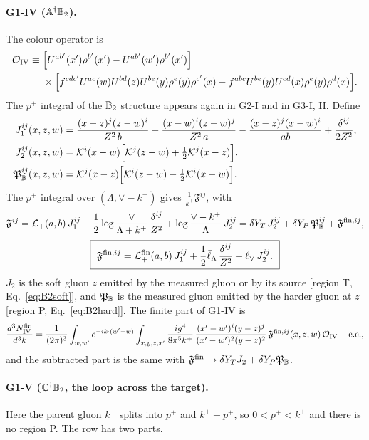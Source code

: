 \paragraph*{G1-IV ($\bar{\mathbb{A}}^\dagger\mathbb{B}_2$).} The colour operator is
\begin{align}
\mathcal{O}_{\rm IV}\equiv{}&\Big[U^{ab'}(x')\rho^{b'}(x')-U^{ab'}(w')\rho^{b'}(x')\Big]\notag\\
&\times\Big[f^{cdc'}U^{ac}(w)U^{bd}(z)U^{be}(y)\rho^e(y)\rho^{c'}(x)-f^{abc}U^{be}(y)U^{cd}(x)\rho^e(y)\rho^d(x)\Big].
\end{align}
The $p^+$ integral of the $\mathbb{B}_2$ structure appears again in G2-I and in G3-I, II. Define
\begin{align}
J_1^{ij}(x,z,w)&=\frac{(x-z)^j(z-w)^i}{Z^2\,b}-\frac{(x-w)^i(z-w)^j}{Z^2\,a}-\frac{(x-z)^j(x-w)^i}{ab}+\frac{\delta^{ij}}{2Z^2},\notag\\
J_2^{ij}(x,z,w)&=\mathcal{K}^i(x-w)\Big[\mathcal{K}^j(z-w)+\tfrac12\mathcal{K}^j(x-z)\Big],\notag\\
\mathfrak P_{\mathbb{B}}^{ij}(x,z,w)&=\mathcal{K}^j(x-z)\Big[\mathcal{K}^i(z-w)-\tfrac12\mathcal{K}^i(x-w)\Big].
\label{eq:J12}
\end{align}
The $p^+$ integral over $(\Lambda,\vee-k^+)$ gives $\frac{1}{k^+}\mathfrak F^{ij}$, with
\begin{equation}
\mathfrak F^{ij}=\mathcal{L}_{+}(a,b)\,J_1^{ij}-\frac12\log\frac{\vee}{\Lambda+k^+}\,\frac{\delta^{ij}}{Z^2}+\log\frac{\vee-k^+}{\Lambda}\,J_2^{ij}=\delta Y_T\,J_2^{ij}+\delta Y_P\,\mathfrak P_{\mathbb{B}}^{ij}+\mathfrak F^{{\rm fin},ij},
\label{eq:Fcal}
\end{equation}
\begin{equation}
\boxed{\ \mathfrak F^{{\rm fin},ij}=\Lp^{\rm fin}(a,b)\,J_1^{ij}+\frac12\lLb\,\frac{\delta^{ij}}{Z^2}+\lV\,J_2^{ij}.\ }
\label{eq:Ffin}
\end{equation}
$J_2$ is the soft gluon $z$ emitted by the measured gluon or by its source [region T, Eq.~\eqref{eq:B2soft}], and $\mathfrak P_{\mathbb{B}}$ is the measured gluon emitted by the harder gluon at $z$ [region P, Eq.~\eqref{eq:B2hard}]. The finite part of G1-IV is
\begin{equation}
\frac{d^3N^{\rm fin}_{\rm IV}}{d^3k}=\frac{1}{(2\pi)^3}\int_{w,w'}e^{-ik\cdot(w'-w)}\int_{x,y,z,x'}\frac{ig^4}{8\pi^5k^+}\,\frac{(x'-w')^i(y-z)^j}{(x'-w')^2(y-z)^2}\,\mathfrak F^{{\rm fin},ij}(x,z,w)\,\mathcal{O}_{\rm IV}+{\rm c.c.},
\label{eq:finIV}
\end{equation}
and the subtracted part is the same with $\mathfrak F^{\rm fin}\to\delta Y_TJ_2+\delta Y_P\mathfrak P_{\mathbb{B}}$.

\paragraph*{G1-V ($\bar{\mathbb{C}}^\dagger\mathbb{B}_2$, the loop across the target).} Here the parent gluon $k^+$ splits into $p^+$ and $k^+-p^+$, so $0<p^+<k^+$ and there is no region P. The row has two parts.

